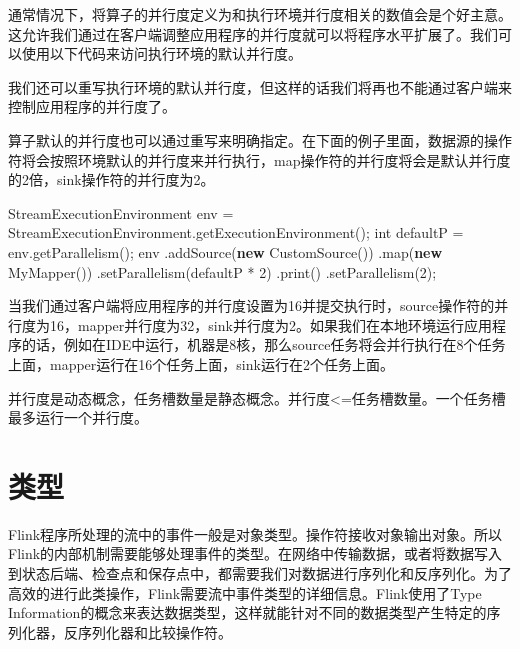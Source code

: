 \documentclass[cn,11pt,chinese]{elegantbook}
\newenvironment{Shaded}{}{}
\newcommand{\DataTypeTok}[1]{\textcolor[rgb]{0.56,0.13,0.00}{#1}}
\newcommand{\DecValTok}[1]{\textcolor[rgb]{0.25,0.63,0.44}{#1}}
\newcommand{\FunctionTok}[1]{\textcolor[rgb]{0.02,0.16,0.49}{#1}}
\newcommand{\KeywordTok}[1]{\textcolor[rgb]{0.00,0.44,0.13}{\textbf{#1}}}
\newcommand{\NormalTok}[1]{#1}
\renewenvironment{quote}{\begin{customblockquote}\list{}{\rightmargin=0em\leftmargin=0em}%
\item\relax\color{blockquote-text}\ignorespaces}{\unskip\unskip\endlist\end{customblockquote}}
\begin{document}
通常情况下，将算子的并行度定义为和执行环境并行度相关的数值会是个好主意。这允许我们通过在客户端调整应用程序的并行度就可以将程序水平扩展了。我们可以使用以下代码来访问执行环境的默认并行度。

我们还可以重写执行环境的默认并行度，但这样的话我们将再也不能通过客户端来控制应用程序的并行度了。

算子默认的并行度也可以通过重写来明确指定。在下面的例子里面，数据源的操作符将会按照环境默认的并行度来并行执行，map操作符的并行度将会是默认并行度的2倍，sink操作符的并行度为2。

\begin{Shaded}
\begin{Highlighting}[]
\NormalTok{StreamExecutionEnvironment env = StreamExecutionEnvironment.}\FunctionTok{getExecutionEnvironment}\NormalTok{();}
\DataTypeTok{int}\NormalTok{ defaultP = env.}\FunctionTok{getParallelism}\NormalTok{();}
\NormalTok{env}
\NormalTok{  .}\FunctionTok{addSource}\NormalTok{(}\KeywordTok{new} \FunctionTok{CustomSource}\NormalTok{())}
\NormalTok{  .}\FunctionTok{map}\NormalTok{(}\KeywordTok{new} \FunctionTok{MyMapper}\NormalTok{())}
\NormalTok{  .}\FunctionTok{setParallelism}\NormalTok{(defaultP * }\DecValTok{2}\NormalTok{)}
\NormalTok{  .}\FunctionTok{print}\NormalTok{()}
\NormalTok{  .}\FunctionTok{setParallelism}\NormalTok{(}\DecValTok{2}\NormalTok{);}
\end{Highlighting}
\end{Shaded}

当我们通过客户端将应用程序的并行度设置为16并提交执行时，source操作符的并行度为16，mapper并行度为32，sink并行度为2。如果我们在本地环境运行应用程序的话，例如在IDE中运行，机器是8核，那么source任务将会并行执行在8个任务上面，mapper运行在16个任务上面，sink运行在2个任务上面。

\begin{quote}
并行度是动态概念，任务槽数量是静态概念。并行度\textless=任务槽数量。一个任务槽最多运行一个并行度。
\end{quote}

\hypertarget{ux7c7bux578b}{%
\section{类型}\label{ux7c7bux578b}}

Flink程序所处理的流中的事件一般是对象类型。操作符接收对象输出对象。所以Flink的内部机制需要能够处理事件的类型。在网络中传输数据，或者将数据写入到状态后端、检查点和保存点中，都需要我们对数据进行序列化和反序列化。为了高效的进行此类操作，Flink需要流中事件类型的详细信息。Flink使用了Type
Information的概念来表达数据类型，这样就能针对不同的数据类型产生特定的序列化器，反序列化器和比较操作符。
\end{document}
